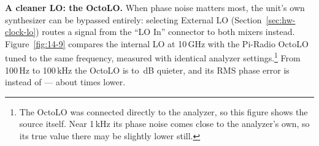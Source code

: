 \textbf{A cleaner LO: the OctoLO.} When phase noise matters most, the unit's own synthesizer can be bypassed
entirely: selecting External LO (Section~\ref{sec:hw-clock-lo}) routes a signal from the ``LO In'' connector to
both mixers instead. Figure~\ref{fig:14-9} compares the internal LO at 10\,GHz with the Pi-Radio OctoLO tuned to
the same frequency, measured with identical analyzer settings.\footnote{The OctoLO was connected directly to the
analyzer, so this figure shows the source itself. Near 1\,kHz its phase noise comes close to the analyzer's own,
so its true value there may be slightly lower still.} From 100\,Hz to 100\,kHz the OctoLO is \pnOctoGainMin{} to
\pnOctoGainMax\,dB quieter, and its RMS phase error is \pnOctoRms\textdegree{} instead of
\pnBoardTenRms\textdegree{} --- about \pnOctoRmsRatio{} times lower.


